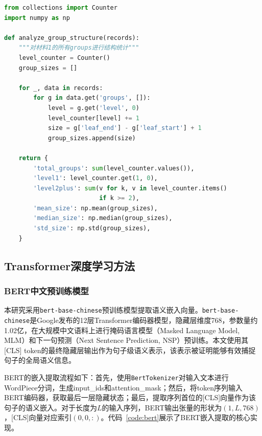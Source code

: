 \documentclass[a4paper,12pt]{article}
\begin{document}
\begin{lstlisting}[language=Python, caption=分组结构统计, label=code:groupstat]
from collections import Counter
import numpy as np

def analyze_group_structure(records):
    """对材料1的所有groups进行结构统计"""
    level_counter = Counter()
    group_sizes = []
    
    for _, data in records:
        for g in data.get('groups', []):
            level = g.get('level', 0)
            level_counter[level] += 1
            size = g['leaf_end'] - g['leaf_start'] + 1
            group_sizes.append(size)
    
    return {
        'total_groups': sum(level_counter.values()),
        'level1': level_counter.get(1, 0),
        'level2plus': sum(v for k, v in level_counter.items() 
                          if k >= 2),
        'mean_size': np.mean(group_sizes),
        'median_size': np.median(group_sizes),
        'std_size': np.std(group_sizes),
    }
\end{lstlisting}

\subsection{Transformer深度学习方法}

\subsubsection{BERT中文预训练模型}

本研究采用\texttt{bert-base-chinese}预训练模型提取语义嵌入向量。\texttt{bert-base-chinese}是Google发布的12层Transformer编码器模型，隐藏层维度768，参数量约1.02亿，在大规模中文语料上进行掩码语言模型（Masked Language Model, MLM）和下一句预测（Next Sentence Prediction, NSP）预训练。本文使用其[CLS] token的最终隐藏层输出作为句子级语义表示，该表示被证明能够有效捕捉句子的全局语义信息。

BERT的嵌入提取流程如下：首先，使用\texttt{BertTokenizer}对输入文本进行WordPiece分词，生成input\_ids和attention\_mask；然后，将token序列输入BERT编码器，获取最后一层隐藏状态；最后，提取序列首位的[CLS]向量作为该句子的语义嵌入。对于长度为$L$的输入序列，BERT输出张量的形状为$(1, L, 768)$，[CLS]向量对应索引$(0, 0, :)$。代码~\ref{code:bert}展示了BERT嵌入提取的核心实现。
\end{document}
